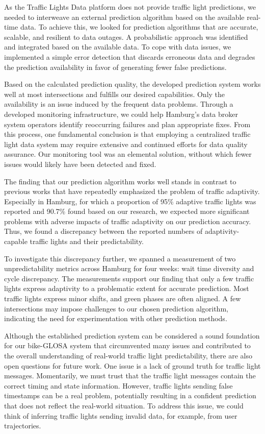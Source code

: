 As the Traffic Lights Data platform does not provide traffic light predictions, we needed to interweave an external prediction algorithm based on the available real-time data. To achieve this, we looked for prediction algorithms that are accurate, scalable, and resilient to data outages. A probabilistic approach was identified and integrated based on the available data. To cope with data issues, we implemented a simple error detection that discards erroneous data and degrades the prediction availability in favor of generating fewer false predictions. 

Based on the calculated prediction quality, the developed prediction system works well at most intersections and fulfills our desired capabilities. Only the availability is an issue induced by the frequent data problems. Through a developed monitoring infrastructure, we could help Hamburg's data broker system operators identify reoccurring failures and plan appropriate fixes. From this process, one fundamental conclusion is that employing a centralized traffic light data system may require extensive and continued efforts for data quality assurance. Our monitoring tool was an elemental solution, without which fewer issues would likely have been detected and fixed.

The finding that our prediction algorithm works well stands in contrast to previous works that have repeatedly emphasized the problem of traffic adaptivity. Especially in Hamburg, for which a proportion of 95\% adaptive traffic lights was reported \cite{bodenheimer_enabling_2014} and 90.7\% found based on our research, we expected more significant problems with adverse impacts of traffic adaptivity on our prediction accuracy. Thus, we found a discrepancy between the reported numbers of adaptivity-capable traffic lights and their predictability. 

To investigate this discrepancy further, we spanned a measurement of two unpredictability metrics across Hamburg for four weeks: wait time diversity and cycle discrepancy. The measurements support our finding that only a few traffic lights express adaptivity to a problematic extent for accurate prediction. Most traffic lights express minor shifts, and green phases are often aligned. A few intersections may impose challenges to our chosen prediction algorithm, indicating the need for experimentation with other prediction methods.

Although the established prediction system can be considered a sound foundation for our bike-GLOSA system that circumvented many issues and contributed to the overall understanding of real-world traffic light predictability, there are also open questions for future work. One issue is a lack of ground truth for traffic light messages. Momentarily, we must trust that the traffic light messages contain the correct timing and state information. However, traffic lights sending false timestamps can be a real problem, potentially resulting in a confident prediction that does not reflect the real-world situation. To address this issue, we could think of inferring traffic lights sending invalid data, for example, from user trajectories. 

